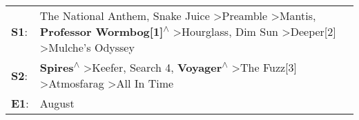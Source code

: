 \begin{supertabular}{p{0.03\textwidth}p{0.92\textwidth}}
 \textbf{S1}:  &  The National Anthem\textsuperscript{}, \enspace Snake Juice\textsuperscript{} \textgreater \enspace Preamble\textsuperscript{} \textgreater \enspace Mantis\textsuperscript{}, \enspace \textbf{Professor Wormbog[1]\textsuperscript{$\wedge$}} \textgreater \enspace Hourglass\textsuperscript{}, \enspace Dim Sun\textsuperscript{} \textgreater \enspace Deeper[2]\textsuperscript{} \textgreater \enspace Mulche's Odyssey\textsuperscript{}  \enspace  \\
 \textbf{S2}:  &                                                                                                     \textbf{Spires\textsuperscript{$\wedge$}} \textgreater \enspace Keefer\textsuperscript{}, \enspace Search 4\textsuperscript{}, \enspace \textbf{Voyager\textsuperscript{$\wedge$}} \textgreater \enspace The Fuzz[3]\textsuperscript{} \textgreater \enspace Atmosfarag\textsuperscript{} \textgreater \enspace All In Time\textsuperscript{}  \enspace  \\
 \textbf{E1}:  &                                                                                                                                                                                                                                                                                                                                                                                                                          August\textsuperscript{}  \enspace  \\
\end{supertabular}
